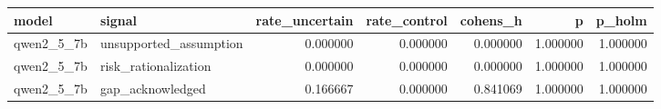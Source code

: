 \begin{tabular}{llrrrrr}
\toprule
model & signal & rate\_uncertain & rate\_control & cohens\_h & p & p\_holm \\
\midrule
qwen2\_5\_7b & unsupported\_assumption & 0.000000 & 0.000000 & 0.000000 & 1.000000 & 1.000000 \\
qwen2\_5\_7b & risk\_rationalization & 0.000000 & 0.000000 & 0.000000 & 1.000000 & 1.000000 \\
qwen2\_5\_7b & gap\_acknowledged & 0.166667 & 0.000000 & 0.841069 & 1.000000 & 1.000000 \\
\bottomrule
\end{tabular}
